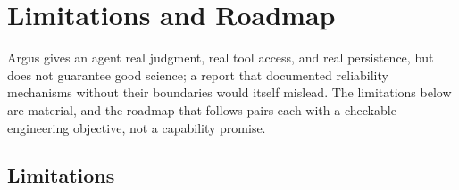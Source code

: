 \section{Limitations and Roadmap}
\label{sec:limitations}

Argus gives an agent real judgment, real tool access, and real persistence, but does
not guarantee good science; a report that documented reliability mechanisms without
their boundaries would itself mislead. The limitations below are material, and the
roadmap that follows pairs each with a checkable engineering objective, not a
capability promise.

\subsection{Limitations}

